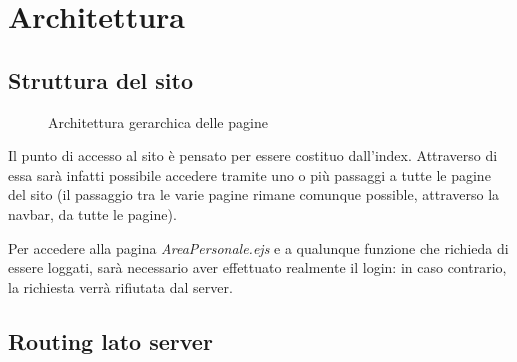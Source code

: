 \chapter{Architettura}

\section{Struttura del sito}

\begin{figure}[ht]
    \centering
    \caption{Architettura gerarchica delle pagine}
\end{figure}

Il punto di accesso al sito è pensato per essere costituo dall'index. Attraverso di essa sarà infatti 
possibile accedere tramite uno o più passaggi a tutte le pagine del sito (il passaggio tra le varie 
pagine rimane comunque possible, attraverso la navbar, da tutte le pagine).

\vspace{5mm}

Per accedere alla pagina \emph{AreaPersonale.ejs} e a qualunque funzione che richieda di essere loggati, 
sarà necessario aver effettuato realmente il login: in caso contrario, la richiesta verrà rifiutata dal 
server.

\section{Routing lato server}

